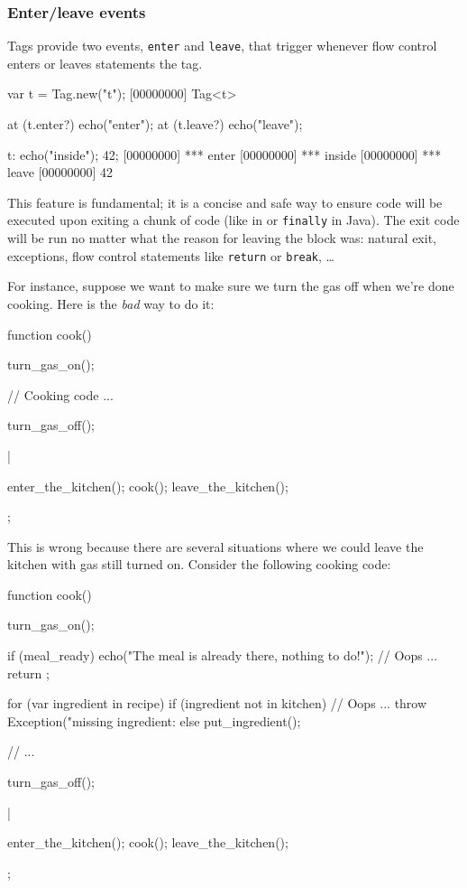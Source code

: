 \subsubsection{Enter/leave events}
\label{sec:specs:tag:enter-leave}

Tags provide two events, \lstinline|enter| and \lstinline|leave|, that
trigger whenever flow control enters or leaves statements the tag.

\begin{urbiscript}
var t = Tag.new("t");
[00000000] Tag<t>

at (t.enter?)
  echo("enter");
at (t.leave?)
  echo("leave");

t: {echo("inside"); 42};
[00000000] *** enter
[00000000] *** inside
[00000000] *** leave
[00000000] 42
\end{urbiscript}

This feature is fundamental; it is a concise and safe way to ensure
code will be executed upon exiting a chunk of code (like
 in \Cxx or \lstinline|finally| in Java). The exit code
will be run no matter what the reason for leaving the block was:
natural exit, exceptions, flow control statements like
\lstinline|return| or \lstinline|break|, \ldots

For instance, suppose we want to make sure we turn the gas off when
we're done cooking. Here is the \emph{bad} way to do it:

\begin{urbiscript}[firstnumber=last]
{
  function cook()
  {
    turn_gas_on();

    // Cooking code ...

    turn_gas_off();
  }|

  enter_the_kitchen();
  cook();
  leave_the_kitchen();
};
\end{urbiscript}

This is wrong because there are several situations where we could leave
the kitchen with gas still turned on. Consider the following cooking
code:

\begin{urbiscript}[firstnumber=last]
{
  function cook()
  {
    turn_gas_on();

    if (meal_ready)
    {
      echo("The meal is already there, nothing to do!");
      // Oops ...
      return
    };

    for (var ingredient in recipe)
      if (ingredient not in kitchen)
        // Oops ...
        throw Exception("missing ingredient: %
      else
        put_ingredient();

    // ...

    turn_gas_off();
  }|

  enter_the_kitchen();
  cook();
  leave_the_kitchen();
};
\end{urbiscript}

